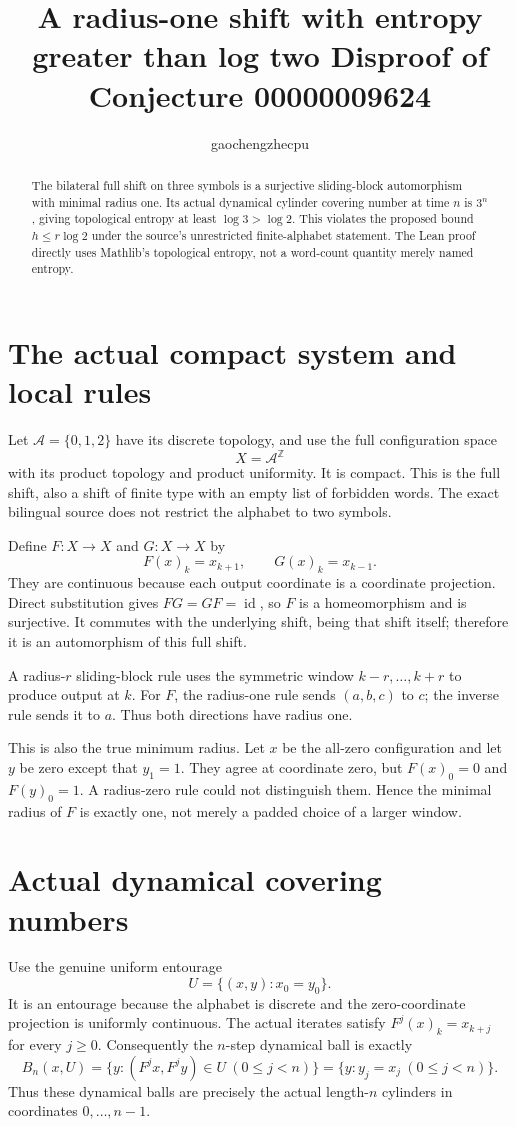 \documentclass[11pt]{article}
\title{A radius-one shift with entropy greater than log two\newline
\large Disproof of Conjecture 00000009624}
\author{gaochengzhecpu}\date{}
\begin{document}
\maketitle
\begin{abstract}
The bilateral full shift on three symbols is a
surjective sliding-block automorphism with minimal
radius one. Its actual dynamical cylinder covering
number at time $n$ is $3^n$, giving topological entropy
at least $\log3>\log2$. This violates the proposed
bound $h\leq r\log2$ under the source's unrestricted
finite-alphabet statement. The Lean proof directly
uses Mathlib's topological entropy, not a word-count
quantity merely named entropy.
\end{abstract}

\section*{The actual compact system and local rules}
Let $\mathcal A=\{0,1,2\}$ have its discrete topology,
and use the full configuration space
\[
                      X=\mathcal A^{\mathbb Z}
\]
with its product topology and product uniformity.
It is compact. This is the full shift, also a shift
of finite type with an empty list of forbidden words.
The exact bilingual source does not restrict the
alphabet to two symbols.

Define $F:X\to X$ and $G:X\to X$ by
\[
                  F(x)_k=x_{k+1},\qquad G(x)_k=x_{k-1}.
\]
They are continuous because each output coordinate
is a coordinate projection. Direct substitution
gives $FG=GF=\operatorname{id}$, so $F$ is a
homeomorphism and is surjective. It commutes with
the underlying shift, being that shift itself;
therefore it is an automorphism of this full shift.

A radius-$r$ sliding-block rule uses the symmetric
window $k-r,\ldots,k+r$ to produce output at $k$.
For $F$, the radius-one rule sends $(a,b,c)$ to
$c$; the inverse rule sends it to $a$. Thus both
directions have radius one.

This is also the true minimum radius. Let $x$ be
the all-zero configuration and let $y$ be zero
except that $y_1=1$. They agree at coordinate zero,
but $F(x)_0=0$ and $F(y)_0=1$. A radius-zero rule
could not distinguish them. Hence the minimal
radius of $F$ is exactly one, not merely a padded
choice of a larger window.

\newpage
\section*{Actual dynamical covering numbers}
Use the genuine uniform entourage
\[
                      U=\{(x,y):x_0=y_0\}.
\]
It is an entourage because the alphabet is discrete
and the zero-coordinate projection is uniformly
continuous. The actual iterates satisfy
$F^j(x)_k=x_{k+j}$ for every $j\geq0$.
Consequently the $n$-step dynamical ball is exactly
\[
 B_n(x,U)=\{y:(F^j x,F^j y)\in U\ (0\leq j<n)\}
       =\{y:y_j=x_j\ (0\leq j<n)\}.
\]
Thus these dynamical balls are precisely the actual
length-$n$ cylinders in coordinates $0,\ldots,n-1$.
\end{document}
